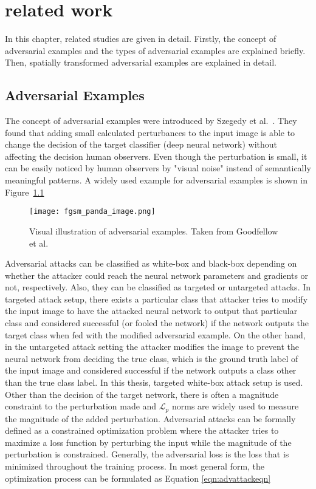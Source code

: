 \chapter{related work}
\label{chp:2_literature}

In this chapter, related studies are given in detail. Firstly, the concept of adversarial examples and the types of adversarial examples are explained briefly. Then, spatially transformed adversarial examples are explained in detail.
\section{Adversarial Examples}

The concept of adversarial examples were introduced by Szegedy et al.~\cite{szegedy2013intriguing}. They found that adding small calculated perturbances to the input image is able to change the decision of the target classifier (deep neural network) without affecting the decision human observers. Even though the perturbation is small, it can be easily noticed by human observers by "visual noise" instead of semantically meaningful patterns. A widely used example for adversarial examples is shown in Figure~\ref{fig:advexample}

\begin{figure}[h]
    \centering
    \texttt{[image: fgsm\_panda\_image.png]}
    \caption{Visual illustration of adversarial examples. Taken from Goodfellow et al.~\cite{goodfellow2014explaining}}\label{fig:advexample}
\end{figure}


Adversarial attacks can be classified as white-box and black-box depending on whether the attacker could reach the neural network parameters and gradients or not, respectively. Also, they can be classified as targeted or untargeted attacks. In targeted attack setup, there exists a particular class that attacker tries to modify the input image to have the attacked neural network to output that particular class and considered successful (or fooled the network) if the network outputs the target class when fed with the modified adversarial example. On the other hand, in the untargeted attack setting the attacker modifies the image to prevent the neural network from deciding the true class, which is the ground truth label of the input image and considered successful if the network outputs a class other than the true class label. In this thesis, targeted white-box attack setup is used. Other than the decision of the target network, there is often a magnitude constraint to the perturbation made and \(\mathcal{L}_p\) norms are widely used to measure the magnitude of the added perturbation. Adversarial attacks can be formally defined as a constrained optimization problem where the attacker tries to maximize a loss function by perturbing the input while the magnitude of the perturbation is constrained. Generally, the adversarial loss is the loss that is minimized throughout the training process. In most general form, the optimization process can be formulated as Equation \ref{eqn:advattackeqn}

